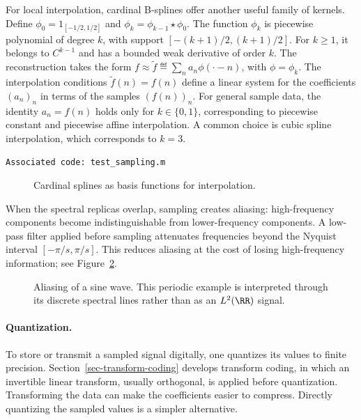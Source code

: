 %
For local interpolation, cardinal B-splines offer another useful family of kernels. Define $\phi_0=1_{[-1/2,1/2]}$ and $\phi_k = \phi_{k-1} \star \phi_0$. The function $\phi_k$ is piecewise polynomial of degree $k$, with support $[-(k+1)/2,(k+1)/2]$. For $k\geq1$, it belongs to $C^{k-1}$ and has a bounded weak derivative of order $k$.
The reconstruction takes the form $f \approx \tilde f \eqdef \sum_n a_n \phi(\cdot-n)$, with $\phi=\phi_k$. The interpolation conditions $\tilde f(n)=f(n)$ define a linear system for the coefficients $(a_n)_n$ in terms of the samples $(f(n))_n$. For general sample data, the identity $a_n=f(n)$ holds only for $k \in \{0,1\}$, corresponding to piecewise constant and piecewise affine interpolation.
%
A common choice is cubic spline interpolation, which corresponds to $k=3$.

\texttt{Associated code: test\_sampling.m}

\begin{figure}[tbp]
\centering
{}
\caption{Cardinal splines as basis functions for interpolation.}
\label{fig-sampling-splines}
\end{figure}



When the spectral replicas overlap, sampling creates aliasing: high-frequency components become indistinguishable from lower-frequency components. A low-pass filter applied before sampling attenuates frequencies beyond the Nyquist interval $[-\pi/s,\pi/s]$. This reduces aliasing at the cost of losing high-frequency information; see Figure~\ref{fig-aliasing}.

\begin{figure}[tbp]
\centering
{}
\caption{Aliasing of a sine wave. This periodic example is interpreted through its discrete spectral lines rather than as an $L^2(\RR)$ signal.}
\label{fig-aliasing}
\end{figure}

\paragraph{Quantization.}

To store or transmit a sampled signal digitally, one quantizes its values to finite precision.
% 
Section~\ref{sec-transform-coding} develops transform coding, in which an invertible linear transform, usually orthogonal, is applied before quantization. Transforming the data can make the coefficients easier to compress. Directly quantizing the sampled values is a simpler alternative.

